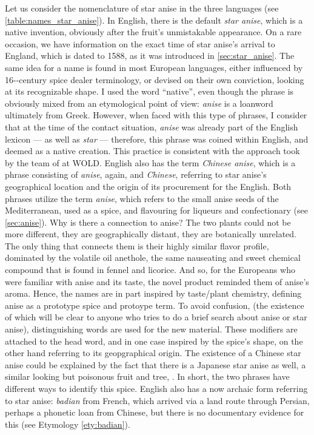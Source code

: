 Let us consider the nomenclature of star anise in the three languages (see \cref{table:names_star_anise}). In English, there is the default \textit{star anise}, which is a native invention, obviously after the fruit's unmistakable appearance. On a rare occasion, we have information on the exact time of star anise's arrival to England, which is dated to 1588, as it was introduced in \cref{sec:star_anise}. The same idea for a name is found in most European languages, either influenced by 16--century spice dealer terminology, or devised on their own conviction, looking at its recognizable shape. I used the word ``native'', even though the phrase is obviously mixed from an etymological point of view: \textit{anise} is a loanword ultimately from Greek. However, when faced with this type of phrases, I consider that at the time of the contact situation, \textit{anise} was already part of the English lexicon --- as well as \textit{star} --- therefore, this phrase was coined within English, and deemed as a native creation. This practice is consistent with the approach took by the team of \textcite{wold} at \gls{WOLD}. English also has the term \textit{Chinese anise}, which is a phrase consisting of \textit{anise}, again, and \textit{Chinese}, referring to star anise's geographical location and the origin of its procurement for the English. Both phrases utilize the term \textit{anise}, which refers to the small anise seeds of the Mediterranean, used as a spice, and flavouring for liqueurs and confectionary (see \cref{sec:anise}). Why is there a connection to anise? The two plants could not be more different, they are geographically distant, they are botanically unrelated. The only thing that connects them is their highly similar flavor profile, dominated by the volatile oil anethole, the same nauseating and sweet chemical compound that is found in fennel and licorice. And so, for the Europeans who were familiar with anise and its taste, the novel product reminded them of anise's aroma. Hence, the names are in part inspired by taste/plant chemistry, defining anise as a prototype spice and protoype term. To avoid confusion, (the existence of which will be clear to anyone who tries to do a brief search about anise or star anise), distinguishing words are used for the new material. These modifiers are attached to the head word, and in one case inspired by the spice's shape, on the other hand referring to its geopgraphical origin. The existence of a Chinese star anise could be explained by the fact that there is a Japanese star anise as well, a similar looking but poisonous fruit and tree, . In short, the two phrases have different ways to identify this spice. English also has a now archaic form referring to star anise: \textit{badian} from French, which arrived via a land route through Persian, perhaps a phonetic loan from Chinese, but there is no documentary evidence for this (see Etymology \ref{ety:badian}).

